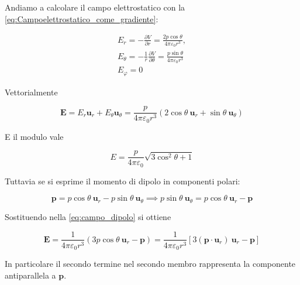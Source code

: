 Andiamo a calcolare il campo elettrostatico con la \ref{eq:Campoelettrostatico_come_gradiente}:

\begin{align}
    E_r = - \frac{\partial V}{\partial r} = \frac{2 p \cos \theta}{4\pi \varepsilon_0 r^3}, \\ E_{\theta} =- \frac{1}{r} \frac{\partial V}{\partial \theta} = \frac{p \sin \theta}{4 \pi \varepsilon_0 r^3}\\
    E_{\varphi} = 0 \qquad \quad
\end{align}

Vettorialmente 

\begin{tcolorbox}[colback=yellow!10!white, colframe=orange!70!black, boxrule=0.8pt]
\begin{equation}
    \mathbf{E} = E_r \mathbf{u}_r + E_{\theta} \mathbf{u}_{\theta} = \frac{p}{4 \pi \varepsilon_0 r^3} (2 \cos \theta \ \mathbf{u}_r + \sin \theta \ \mathbf{u}_{\theta})
    \label{eq:componenti_campo_dipolo}
\end{equation}
\end{tcolorbox}

E il modulo vale 

\begin{equation}
    E = \frac{p}{4 \pi \varepsilon_0} \sqrt{3 \cos^2 \theta + 1}
\end{equation}

Tuttavia se si esprime il momento di dipolo in componenti polari:

\begin{equation}
    \mathbf{p} = p \cos \theta \ \mathbf{u}_r - p \sin \theta \ \mathbf{u}_{\theta} \implies p \sin \theta \ \mathbf{u}_{\theta} = p \cos \theta \ \mathbf{u}_r - \mathbf{p}
\end{equation}

Sostituendo nella \ref{eq:campo_dipolo} si ottiene 

\begin{tcolorbox}[colback=yellow!10!white, colframe=orange!70!black, boxrule=0.8pt]
\begin{equation}
    \mathbf{E} = \frac{1}{4 \pi \varepsilon_0 r^3} (3p \cos \theta \ \mathbf{u}_r - \mathbf{p}) = \frac{1}{4 \pi \varepsilon_0 r^3} \left [ 3(\mathbf{p} \cdot \mathbf{u}_r) \ \mathbf{u}_r - \mathbf{p}\right ]
\label{eq:campo_dipolo}
\end{equation}
\end{tcolorbox}

In particolare il secondo termine nel secondo membro rappresenta la componente antiparallela a $\mathbf{p}$.

